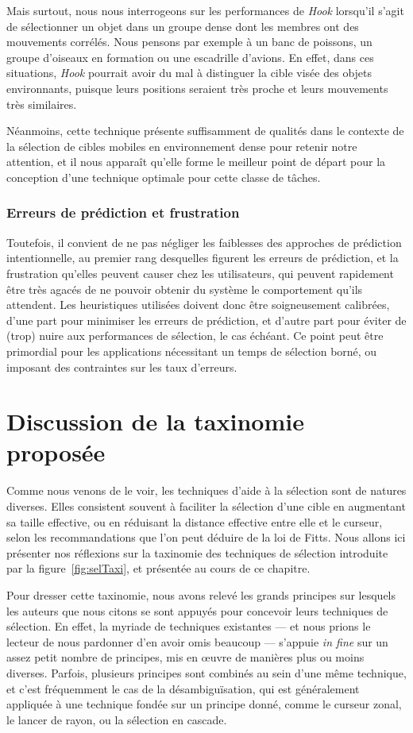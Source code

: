 	Mais surtout, nous nous interrogeons sur les performances de \emph{Hook} lorsqu'il s'agit de sélectionner un objet dans un groupe dense dont les membres ont des mouvements corrélés. Nous pensons par exemple à un banc de poissons, un groupe d'oiseaux en formation ou une escadrille d'avions. En effet, dans ces situations, \emph{Hook} pourrait avoir du mal à distinguer la cible visée des objets environnants, puisque leurs positions seraient très proche et leurs mouvements très similaires.
	
	Néanmoins, cette technique présente suffisamment de qualités dans le contexte de la sélection de cibles mobiles en environnement dense pour retenir notre attention, et il nous apparaît qu'elle forme le meilleur point de départ pour la conception d'une technique optimale pour cette classe de tâches.
	
	\subsubsection{Erreurs de prédiction et frustration}
	Toutefois, il convient de ne pas négliger les faiblesses des approches de prédiction intentionnelle, au premier rang desquelles figurent les erreurs de prédiction, et la frustration qu'elles peuvent causer chez les utilisateurs, qui peuvent rapidement être très agacés de ne pouvoir obtenir du système le comportement qu'ils attendent. Les heuristiques utilisées doivent donc être soigneusement calibrées, d'une part pour minimiser les erreurs de prédiction, et d'autre part pour éviter de (trop) nuire aux performances de sélection, le cas échéant. Ce point peut être primordial pour les applications nécessitant un temps de sélection borné, ou imposant des contraintes sur les taux d'erreurs.
	
\section{Discussion de la taxinomie proposée}
    Comme nous venons de le voir, les techniques d'aide à la sélection sont de natures diverses. Elles consistent souvent à faciliter la sélection d'une cible en augmentant sa taille effective, ou en réduisant la distance effective entre elle et le curseur, selon les recommandations que l'on peut déduire de la loi de Fitts. Nous allons ici présenter nos réflexions sur la taxinomie des techniques de sélection introduite par la figure~\ref{fig:selTaxi}, et présentée au cours de ce chapitre.
    
    Pour dresser cette taxinomie, nous avons relevé les grands principes sur lesquels les auteurs que nous citons se sont appuyés pour concevoir leurs techniques de sélection. En effet, la myriade de techniques existantes --- et nous prions le lecteur de nous pardonner d'en avoir omis beaucoup --- s'appuie \emph{in fine} sur un assez petit nombre de principes, mis en œuvre de manières plus ou moins diverses. Parfois, plusieurs principes sont combinés au sein d'une même technique, et c'est fréquemment le cas de la désambiguïsation, qui est généralement appliquée à une technique fondée sur un principe donné, comme le curseur zonal, le lancer de rayon, ou la sélection en cascade.
    
